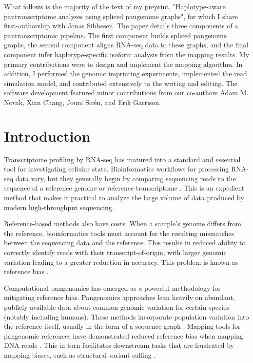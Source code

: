 \documentclass[11pt]{ucthesis}
\begin{document}
What follows is the majority of the text of my preprint, "Haplotype-aware pantranscriptome analyses using spliced pangenome graphs", for which I share first-authorship with Jonas Sibbesen\cite{sibbesen2021haplotype}. The paper details three components of a pantranscriptomic pipeline. The first component builds spliced pangenome graphs, the second component aligns RNA-seq data to these graphs, and the final component infer haplotype-specific isoform analysis from the mapping results. My primary contributions were to design and implement the mapping algorithm. In addition, I performed the genomic imprinting experiments, implemented the read simulation model, and contributed extensively to the writing and editing. The software development featured minor contributions from our co-authors Adam M. Novak, Xian Chang, Jouni Sir\'{e}n, and Erik Garrison.

\section{Introduction}

Transcriptome profiling by RNA-seq has matured into a standard and essential tool for investigating cellular state. Bioinformatics workflows for processing RNA-seq data vary, but they generally begin by comparing sequencing reads to the sequence of a reference genome or reference transcriptome \cite{li2011rsem,dobin2013star,bray2016near,patro2017salmon}. This is an expedient method that makes it practical to analyze the large volume of data produced by modern high-throughput sequencing.

Reference-based methods also have costs. When a sample's genome differs from the reference, bioinformatics tools must account for the resulting mismatches between the sequencing data and the reference. This results in reduced ability to correctly identify reads with their transcript-of-origin, with larger genomic variation leading to a greater reduction in accuracy. This problem is known as reference bias \cite{stevenson2013sources}.

Computational pangenomics has emerged as a powerful methodology for mitigating reference bias. Pangenomics approaches lean heavily on abundant, publicly-available data about common genomic variation for certain species (notably including humans). These methods incorporate population variation into the reference itself, usually in the form of a sequence graph \cite{computational2018computational,eizenga2020pangenome}. Mapping tools for pangenomic references have demonstrated reduced reference bias when mapping DNA reads \cite{garrison2018variation,rakocevic2019fast,chen2021reference}. This in turn facilitates downstream tasks that are frustrated by mapping biases, such as structural variant calling \cite{hickey2020genotyping,sibbesen2018accurate}.
\end{document}
